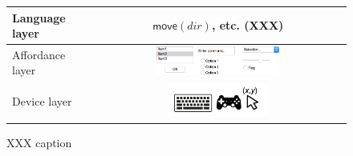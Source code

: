 \newcommand{\param}[1]{\langle #1 \rangle}
\newcommand{\syn}[1]{\mathsf{#1}}

  \begin{figure}
    \begin{tabular}{|l|c|}
      \hline
      Language layer   & $\syn{move}(dir)$, etc. (XXX) \\
      \hline
      Affordance layer &
        \includegraphics[width=0.5\textwidth]{ui-elements.png}\\
      \hline
      Device layer & 
        \includegraphics[width=0.4\textwidth]{control-devices.png}\\
      \hline
    \end{tabular}
    \caption{XXX caption}
    \label{fig:layers}
  \end{figure}

